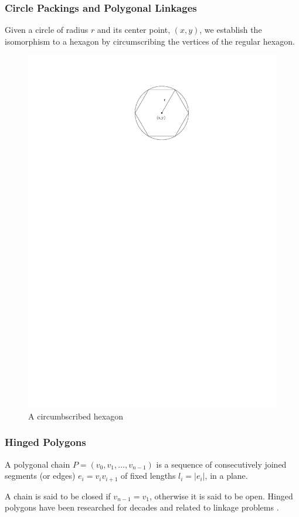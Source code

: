 \subsubsection{Circle Packings and Polygonal Linkages}
Given a circle of radius $r$ and its center point, $(x,y)$, we establish the isomorphism  to a hexagon by
circumscribing the vertices of the regular hexagon.
\begin{figure}[h]
\begin{center}
\includegraphics{graphics/circumscribedHexagon.pdf}
\caption{A circumbscribed hexagon}
\end{center}
\end{figure}
\subsubsection{Hinged Polygons}
\begin{definition}\label{def}
A polygonal chain $P = \left( v_0, v_1, \dots, v_{n-1}\right) $ is a sequence of
consecutively joined segments (or edges) $e_i = v_i v_{i+1}$ of fixed lengths
$l_i = \left\vert e_i\right\vert $, in a plane. \cite{Biedl99lockedand}
\end{definition}
A chain is said to be closed if $v_{n-1} = v_1$, otherwise it is said to be
open. Hinged polygons have been researched for decades and related to linkage problems
\cite{Biedl99lockedand,canny1988complexity}.

